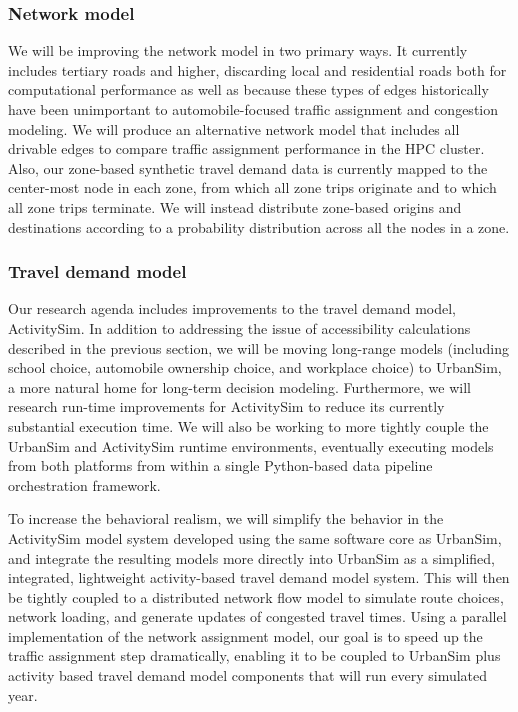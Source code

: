 \subsubsection{Network model}

We will be improving the network model in two primary ways. It currently includes tertiary roads and higher, discarding local and residential roads both for computational performance as well as because these types of edges historically have been unimportant to automobile-focused traffic assignment and congestion modeling. We will produce an alternative network model that includes all drivable edges to compare traffic assignment performance in the HPC cluster. Also, our zone-based synthetic travel demand data is currently mapped to the center-most node in each zone, from which all zone trips originate and to which all zone trips terminate. We will instead distribute zone-based origins and destinations according to a probability distribution across all the nodes in a zone.

\subsubsection{Travel demand model}

Our research agenda includes improvements to the travel demand model, ActivitySim. In addition to addressing the issue of accessibility calculations described in the previous section, we will be moving long-range models (including school choice, automobile ownership choice, and workplace choice) to UrbanSim, a more natural home for long-term decision modeling. Furthermore, we will research run-time improvements for ActivitySim to reduce its currently substantial execution time. We will also be working to more tightly couple the UrbanSim and ActivitySim runtime environments, eventually executing models from both platforms from within a single Python-based data pipeline orchestration framework. 

To increase the behavioral realism, we will simplify the behavior in the ActivitySim model system developed using the same software core as UrbanSim, and integrate the resulting models more directly into UrbanSim as a simplified, integrated, lightweight activity-based travel demand model system. This will then be tightly coupled to a distributed network flow model to simulate route choices, network loading, and generate updates of congested travel times. Using a parallel implementation of the network assignment model, our goal is to speed up the traffic assignment step dramatically, enabling it to be coupled to UrbanSim plus activity based travel demand model components that will run every simulated year.


